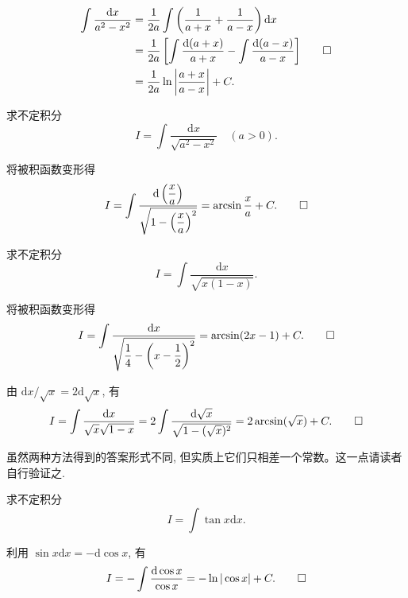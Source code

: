\begin{solve}[{解法 2}]
\[
\begin{aligned}
  \int\frac{\mathrm dx}{a^2-x^2}
  &=
  \frac1{2a}\int\left(\frac1{a+x}+\frac1{a-x}\right)\mathrm dx\\
  &=
  \frac1{2a}\left[\int\frac{\mathrm d(a+x)}{a+x}
  -\int\frac{\mathrm d(a-x)}{a-x}\right]\\
  &=
  \frac1{2a}\ln\left|\frac{a+x}{a-x}\right|+C.
\end{aligned}
\qedhere
\]
\end{solve}


\begin{example}\label{example:ma-6-2-8}
求不定积分
\[
  I=\int\frac{\mathrm dx}{\sqrt{a^2-x^2}}\quad (a>0).
\]
\end{example}


\begin{solve}
将被积函数变形得
\[
  I=
  \int\frac{\mathrm d\left(\dfrac xa\right)}
  {\sqrt{1-\left(\dfrac xa\right)^2}}
  =
  \arcsin\frac xa+C.
\qedhere
\]
\end{solve}


\begin{example}\label{example:ma-6-2-9}
求不定积分
\[
  I=\int\frac{\mathrm dx}{\sqrt{x(1-x)}}.
\]
\end{example}


\begin{solve}[{解法 1}]
将被积函数变形得
\[
  I=
  \int\frac{\mathrm dx}{\sqrt{\dfrac14-\left(x-\dfrac12\right)^2}}
  =
  \arcsin(2x-1)+C.
\qedhere
\]
\end{solve}


\begin{solve}[{解法 2}]
由 $\mathrm dx/\sqrt x=2\mathrm d\sqrt x$, 有
\[
  I=
  \int\frac{\mathrm dx}{\sqrt x\sqrt{1-x}}
  =
  2\int\frac{\mathrm d\sqrt x}{\sqrt{1-(\sqrt x)^2}}
  =
  2\arcsin(\sqrt x)+C.
\qedhere
\]
\end{solve}


\begin{remark}\label{remark:ma-6-source-34}
虽然两种方法得到的答案形式不同, 但实质上它们只相差一个常数。这一点请读者自行验证之.
\end{remark}


\begin{example}\label{example:ma-6-2-10}
求不定积分
\[
  I=\int\tan x\mathrm dx.
\]
\end{example}


\begin{solve}
利用 $\sin x\mathrm dx=-\mathrm d\cos x$, 有
\[
  I=-\int\frac{\mathrm d\cos x}{\cos x}
  =
  -\ln|\cos x|+C.
\qedhere
\]
\end{solve}


